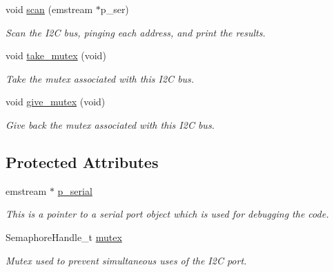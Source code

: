 \begin{DoxyCompactItemize}
void \hyperlink{classi2c__master_abec7ac7b06f563c195a13ae51b076b0a}{scan} (emstream $\ast$p\-\_\-ser)
\begin{DoxyCompactList}\small\item\em Scan the I2\-C bus, pinging each address, and print the results. \end{DoxyCompactList}\item 
void \hyperlink{classi2c__master_aa9afe624ce1825efb79c147093ad8ad3}{take\-\_\-mutex} (void)
\begin{DoxyCompactList}\small\item\em Take the mutex associated with this I2\-C bus. \end{DoxyCompactList}\item 
void \hyperlink{classi2c__master_a49ea221508ef4f0310bc61030773bd58}{give\-\_\-mutex} (void)
\begin{DoxyCompactList}\small\item\em Give back the mutex associated with this I2\-C bus. \end{DoxyCompactList}\end{DoxyCompactItemize}
\subsection*{Protected Attributes}
\begin{DoxyCompactItemize}
\item 
\hypertarget{classi2c__master_a862f9d4025a9b98dbc6491b3430840a0}{emstream $\ast$ \hyperlink{classi2c__master_a862f9d4025a9b98dbc6491b3430840a0}{p\-\_\-serial}}\label{classi2c__master_a862f9d4025a9b98dbc6491b3430840a0}

\begin{DoxyCompactList}\small\item\em This is a pointer to a serial port object which is used for debugging the code. \end{DoxyCompactList}\item 
\hypertarget{classi2c__master_a94b87e4fe5ef8e2fdfbcfec893c885ef}{Semaphore\-Handle\-\_\-t \hyperlink{classi2c__master_a94b87e4fe5ef8e2fdfbcfec893c885ef}{mutex}}\label{classi2c__master_a94b87e4fe5ef8e2fdfbcfec893c885ef}

\begin{DoxyCompactList}\small\item\em Mutex used to prevent simultaneous uses of the I2\-C port. \end{DoxyCompactList}\end{DoxyCompactItemize}


